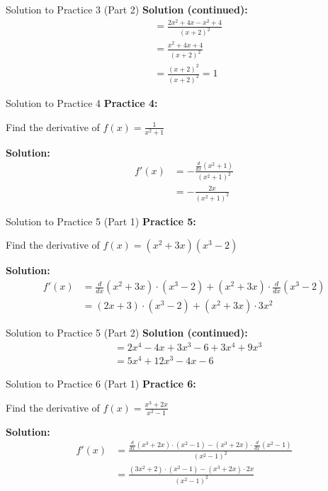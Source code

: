 \documentclass[aspectratio=169]{beamer}
\begin{document}
\begin{frame}{Solution to Practice 3 (Part 2)}
\textbf{Solution (continued):}
\[
\begin{aligned}
  &= \frac{2x^2 + 4x - x^2 + 4}{(x+2)^2} \\
  &= \frac{x^2 + 4x + 4}{(x+2)^2} \\
  &= \frac{(x+2)^2}{(x+2)^2} = 1
\end{aligned}
\]
\end{frame}

\begin{frame}{Solution to Practice 4}
\textbf{Practice 4:}

Find the derivative of $f(x) = \frac{1}{x^2 + 1}$

\textbf{Solution:}
\[
\begin{aligned}
  f'(x) &= -\frac{\frac{d}{dx}(x^2 + 1)}{(x^2 + 1)^2} \\
  &= -\frac{2x}{(x^2 + 1)^2}
\end{aligned}
\]
\end{frame}

\begin{frame}{Solution to Practice 5 (Part 1)}
\textbf{Practice 5:}

Find the derivative of $f(x) = (x^2 + 3x)(x^3 - 2)$

\textbf{Solution:}
\[
\begin{aligned}
  f'(x) &= \frac{d}{dx}(x^2 + 3x) \cdot (x^3 - 2) + (x^2 + 3x) \cdot \frac{d}{dx}(x^3 - 2) \\
  &= (2x + 3) \cdot (x^3 - 2) + (x^2 + 3x) \cdot 3x^2
\end{aligned}
\]
\end{frame}

\begin{frame}{Solution to Practice 5 (Part 2)}
\textbf{Solution (continued):}
\[
\begin{aligned}
  &= 2x^4 - 4x + 3x^3 - 6 + 3x^4 + 9x^3 \\
  &= 5x^4 + 12x^3 - 4x - 6
\end{aligned}
\]
\end{frame}

\begin{frame}{Solution to Practice 6 (Part 1)}
\textbf{Practice 6:}

Find the derivative of $f(x) = \frac{x^3 + 2x}{x^2 - 1}$

\textbf{Solution:}
\[
\begin{aligned}
  f'(x) &= \frac{\frac{d}{dx}(x^3 + 2x) \cdot (x^2 - 1) - (x^3 + 2x) \cdot \frac{d}{dx}(x^2 - 1)}{(x^2 - 1)^2} \\
  &= \frac{(3x^2 + 2) \cdot (x^2 - 1) - (x^3 + 2x) \cdot 2x}{(x^2 - 1)^2}
\end{aligned}
\]
\end{frame}
\end{document}
